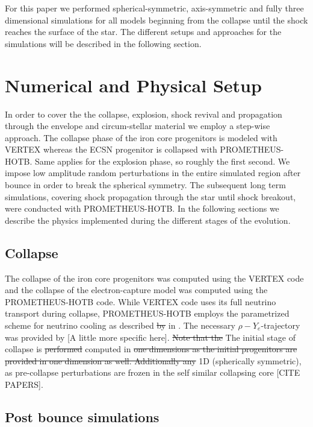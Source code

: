 \documentclass[fleqn,usenatbib]{mnras}
\newcommand{\prom}{\textsc{P{\footnotesize ROMETHEUS}-H{\footnotesize OT}B}\xspace}
\newcommand{\vertex}{\textsc{V{\footnotesize ERTEX}}\xspace}
\newcommand{\NY}[2]{{\color{blue}\sout{#1}#2}}
\begin{document}
For this paper we performed spherical-symmetric, axis-symmetric and fully three dimensional simulations for all models beginning from the collapse until the shock reaches the surface of the star. The different setups and approaches for the simulations will be described in the following section.

\section{Numerical and Physical Setup}
\label{sec:explosionModeling}
In order to cover the the collapse, explosion, shock revival and propagation through the envelope and circum-stellar material we employ a step-wise approach.
The collapse phase of the iron core progenitors is modeled with \vertex whereas the ECSN progenitor is collapsed with \prom.
Same applies for the explosion phase, so roughly the first second.  We impose low amplitude random perturbations in the entire simulated region after bounce in order to break the spherical symmetry. 
The subsequent long term simulations, covering shock propagation through the star until shock breakout, were conducted with \prom.
In the following sections we describe the physics implemented during the different stages of the evolution.

\subsection{Collapse}
The collapse of the iron core progenitors was computed using the \vertex code and the collapse of the  electron-capture model was computed using the \NY{}{\prom} code. While \vertex code uses its full neutrino transport during collapse, \prom employs the parametrized scheme for neutrino cooling as described \NY{by}{ in} \citet{Liebendoerfer2005}. The necessary $\rho-Y_{e}$-trajectory was provided by \cite{Huedepohl2018} \NY{}{[A little more specific here]}.
\NY{Note that the}{ The initial stage of} collapse is \NY{performed}{ computed} in \NY{one dimensions as the initial progenitors are provided in one dimension as well. Additionally any}{ 1D (spherically symmetric), as} pre-collapse perturbations are frozen in the self similar collapsing core \NY{}{[CITE PAPERS]}. 

\subsection{Post bounce simulations}
\end{document}
